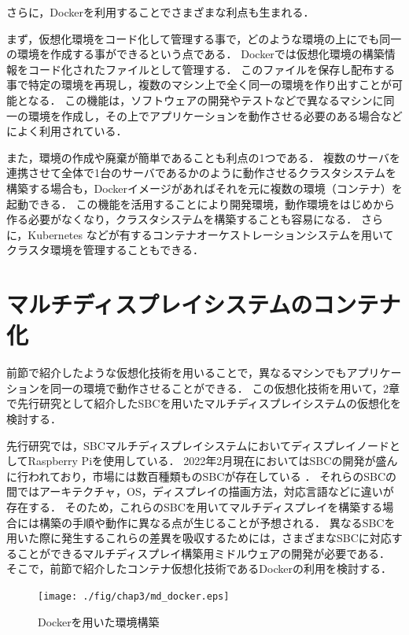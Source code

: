 さらに，Dockerを利用することでさまざまな利点も生まれる．

まず，仮想化環境をコード化して管理する事で，どのような環境の上にでも同一の環境を作成する事ができるという点である．
Dockerでは仮想化環境の構築情報をコード化されたファイルとして管理する．
このファイルを保存し配布する事で特定の環境を再現し，複数のマシン上で全く同一の環境を作り出すことが可能となる．
この機能は，ソフトウェアの開発やテストなどで異なるマシンに同一の環境を作成し，その上でアプリケーションを動作させる必要のある場合などによく利用されている．

また，環境の作成や廃棄が簡単であることも利点の1つである．
複数のサーバを連携させて全体で1台のサーバであるかのように動作させるクラスタシステムを構築する場合も，Dockerイメージがあればそれを元に複数の環境（コンテナ）を起動できる．
この機能を活用することにより開発環境，動作環境をはじめから作る必要がなくなり，クラスタシステムを構築することも容易になる．
さらに，Kubernetes \cite{k8s}などが有するコンテナオーケストレーションシステムを用いてクラスタ環境を管理することもできる．

\section{マルチディスプレイシステムのコンテナ化}
前節で紹介したような仮想化技術を用いることで，異なるマシンでもアプリケーションを同一の環境で動作させることができる．
この仮想化技術を用いて，2章で先行研究として紹介したSBCを用いたマルチディスプレイシステムの仮想化を検討する．

先行研究では，SBCマルチディスプレイシステムにおいてディスプレイノードとしてRaspberry Piを使用している．
2022年2月現在においてはSBCの開発が盛んに行われており，市場には数百種類ものSBCが存在している \cite{hackerbords}．
それらのSBCの間ではアーキテクチャ，OS，ディスプレイの描画方法，対応言語などに違いが存在する．
そのため，これらのSBCを用いてマルチディスプレイを構築する場合には構築の手順や動作に異なる点が生じることが予想される．
異なるSBCを用いた際に発生するこれらの差異を吸収するためには，さまざまなSBCに対応することができるマルチディスプレイ構築用ミドルウェアの開発が必要である．
そこで，前節で紹介したコンテナ仮想化技術であるDockerの利用を検討する．

\begin{figure}[H]
    \hspace*{\fill}
    \texttt{[image: ./fig/chap3/md\_docker.eps]}
    \hspace*{\fill}
    \caption{Dockerを用いた環境構築}
    \label{docker_usage}
\end{figure}

